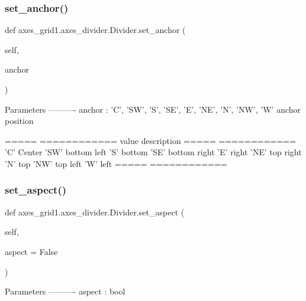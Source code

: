 \subsubsection{\texorpdfstring{set\+\_\+anchor()}{set\_anchor()}}
{\footnotesize\ttfamily def axes\+\_\+grid1.\+axes\+\_\+divider.\+Divider.\+set\+\_\+anchor (\begin{DoxyParamCaption}\item[{}]{self,  }\item[{}]{anchor }\end{DoxyParamCaption})}

\begin{DoxyVerb}Parameters
----------
anchor : {'C', 'SW', 'S', 'SE', 'E', 'NE', 'N', 'NW', 'W'}
    anchor position

  =====  ============
  value  description
  =====  ============
  'C'    Center
  'SW'   bottom left
  'S'    bottom
  'SE'   bottom right
  'E'    right
  'NE'   top right
  'N'    top
  'NW'   top left
  'W'    left
  =====  ============\end{DoxyVerb}
 \mbox{\label{classaxes__grid1_1_1axes__divider_1_1Divider_a05ef4b0d3d24ce059f0d7f5b627e314a}} 
\subsubsection{\texorpdfstring{set\+\_\+aspect()}{set\_aspect()}}
{\footnotesize\ttfamily def axes\+\_\+grid1.\+axes\+\_\+divider.\+Divider.\+set\+\_\+aspect (\begin{DoxyParamCaption}\item[{}]{self,  }\item[{}]{aspect = {\ttfamily False} }\end{DoxyParamCaption})}

\begin{DoxyVerb}Parameters
----------
aspect : bool
\end{DoxyVerb}
 \mbox{\label{classaxes__grid1_1_1axes__divider_1_1Divider_a490d0e4e310c57c497614ed6b17fd2c2}} 

